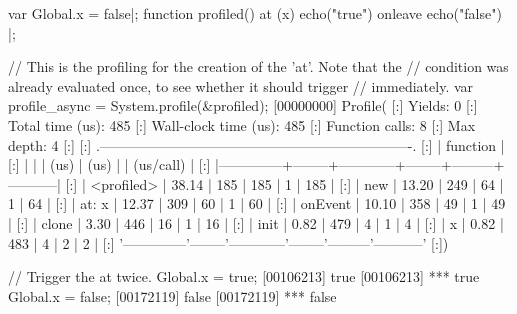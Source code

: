 \begin{urbiscript}
var Global.x = false|;
function profiled()
{
  at (x)
    echo("true")
  onleave
    echo("false")
}|;

// This is the profiling for the creation of the 'at'. Note that the
// condition was already evaluated once, to see whether it should trigger
// immediately.
var profile_async = System.profile(&profiled);
[00000000] Profile(
[:]  Yields:                    0
[:]  Total time (us):         485
[:]  Wall-clock time (us):    485
[:]  Function calls:            8
[:]  Max depth:                 4
[:]
[:]  .-------------------------------------------------------------------.
[:]  |   function   |   %
[:]  |              |        |    (us)    |  (us)  |         | (us/call) |
[:]  |--------------+--------+------------+--------+---------+-----------|
[:]  |   <profiled> |  38.14 |        185 |    185 |       1 |       185 |
[:]  |          new |  13.20 |        249 |     64 |       1 |        64 |
[:]  |    at: { x } |  12.37 |        309 |     60 |       1 |        60 |
[:]  |      onEvent |  10.10 |        358 |     49 |       1 |        49 |
[:]  |        clone |   3.30 |        446 |     16 |       1 |        16 |
[:]  |         init |   0.82 |        479 |      4 |       1 |         4 |
[:]  |            x |   0.82 |        483 |      4 |       2 |         2 |
[:]  '--------------'--------'------------'--------'---------'-----------'
[:])

// Trigger the at twice.
Global.x = true;
[00106213] true
[00106213] *** true
Global.x = false;
[00172119] false
[00172119] *** false


\end{urbiscript}
